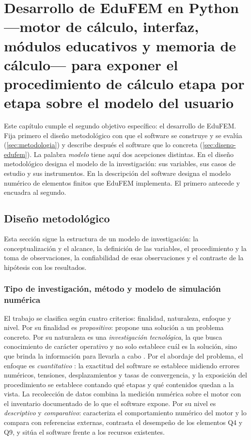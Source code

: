 \chapter{Desarrollo de EduFEM en Python ---motor de cálculo, interfaz, módulos educativos y memoria de cálculo--- para exponer el procedimiento de cálculo etapa por etapa sobre el modelo del usuario}
\label{cap:diseno}

Este capítulo cumple el segundo objetivo específico: el desarrollo de EduFEM. Fija primero el diseño metodológico con que el software se construye y se evalúa (\autoref{sec:metodologia}) y describe después el software que lo concreta (\autoref{sec:diseno-edufem}). La palabra \emph{modelo} tiene aquí dos acepciones distintas. En el diseño metodológico designa el modelo de la investigación: sus variables, sus casos de estudio y sus instrumentos. En la descripción del software designa el modelo numérico de elementos finitos que EduFEM implementa. El primero antecede y encuadra al segundo.

\section{Diseño metodológico}
\label{sec:metodologia}

Esta sección sigue la estructura de un modelo de investigación: la conceptualización y el alcance, la definición de las variables, el procedimiento y la toma de observaciones, la confiabilidad de esas observaciones y el contraste de la hipótesis con los resultados.

\subsection{Tipo de investigación, método y modelo de simulación numérica}
\label{sec:proceso-met}

El trabajo se clasifica según cuatro criterios: finalidad, naturaleza, enfoque y nivel. Por su finalidad es \emph{propositivo}: propone una solución a un problema concreto. Por su naturaleza es una \emph{investigación tecnológica}, la que busca conocimiento de carácter operativo y no solo establece cuál es la solución, sino que brinda la información para llevarla a cabo \autocite[p.~91]{garciacordoba2005tecnologica}. Por el abordaje del problema, el enfoque es \emph{cuantitativo} \autocite[p.~6]{sampieri2018metodologia}: la exactitud del software se establece midiendo errores numéricos, tensiones, desplazamientos y tasas de convergencia, y la exposición del procedimiento se establece contando qué etapas y qué contenidos quedan a la vista. La recolección de datos combina la medición numérica sobre el motor con el inventario documentado de lo que el software expone. Por su nivel es \emph{descriptivo} y \emph{comparativo}: caracteriza el comportamiento numérico del motor y lo compara con referencias externas, contrasta el desempeño de los elementos Q4 y Q9, y sitúa el software frente a los recursos existentes.

